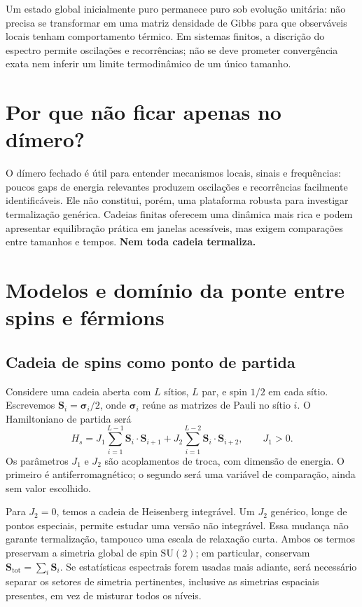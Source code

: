 \documentclass[a4paper,11pt]{article}
\begin{document}
Um estado global inicialmente puro permanece puro sob evolução unitária:
não precisa se transformar em uma matriz densidade de Gibbs para que
observáveis locais tenham comportamento térmico. Em sistemas finitos, a
discrição do espectro permite oscilações e recorrências; não se deve
prometer convergência exata nem inferir um limite termodinâmico de um
único tamanho.

\section{Por que não ficar apenas no dímero?}

O dímero fechado é útil para entender mecanismos locais, sinais e
frequências: poucos gaps de energia relevantes produzem oscilações e
recorrências facilmente identificáveis. Ele não constitui, porém, uma
plataforma robusta para investigar termalização genérica. Cadeias finitas
oferecem uma dinâmica mais rica e podem apresentar equilibração prática
em janelas acessíveis, mas exigem comparações entre tamanhos e tempos.
\textbf{Nem toda cadeia termaliza.}

\newpage
\section{Modelos e domínio da ponte entre spins e férmions}

\subsection{Cadeia de spins como ponto de partida}

Considere uma cadeia aberta com $L$ sítios, $L$ par, e spin $1/2$ em cada
sítio. Escrevemos $\mathbf S_i=\boldsymbol{\sigma}_i/2$, onde
$\boldsymbol{\sigma}_i$ reúne as matrizes de Pauli no sítio $i$. O Hamiltoniano
de partida será
\begin{equation}
  H_s =
  J_1\sum_{i=1}^{L-1}\mathbf S_i\cdot\mathbf S_{i+1}
  +J_2\sum_{i=1}^{L-2}\mathbf S_i\cdot\mathbf S_{i+2},
  \qquad J_1>0.
  \label{eq:spin}
\end{equation}
Os parâmetros $J_1$ e $J_2$ são acoplamentos de troca, com dimensão de
energia. O primeiro é antiferromagnético; o segundo será uma variável
de comparação, ainda sem valor escolhido.

Para $J_2=0$, temos a cadeia de Heisenberg integrável. Um $J_2$ genérico,
longe de pontos especiais, permite estudar uma versão não integrável.
Essa mudança não garante termalização, tampouco uma escala de relaxação
curta. Ambos os termos preservam a simetria global de spin
$\mathrm{SU}(2)$; em particular, conservam
$\mathbf S_{\mathrm{tot}}=\sum_i\mathbf S_i$.
Se estatísticas espectrais forem usadas mais adiante, será necessário
separar os setores de simetria pertinentes, inclusive as simetrias
espaciais presentes, em vez de misturar todos os níveis.
\end{document}
